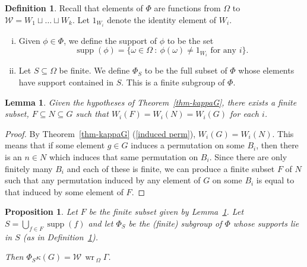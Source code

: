\documentclass[11pt,a4paper]{amsart}
\newtheorem{proposition}[theorem]{Proposition}
\newtheorem{lemma}[theorem]{Lemma}
\theoremstyle{definition}
\newtheorem{definition}[theorem]{Definition}
\theoremstyle{remark}
\newcommand{\supp}{\operatorname{supp}}
\newcommand{\base}{\Phi}
\renewcommand{\wr}{\operatorname{\,wr\,}}
\begin{document}
\begin{definition} \label{support} Recall that elements of $\base$ are functions from $\Omega$ to $\mathcal{W} = W_1 \sqcup \ldots \sqcup W_k$. Let $1_{W_i}$ denote the identity element of $W_i$. 
	\begin{enumerate}[(i)]
		\item  Given $\phi \in \Phi$, we define the support of $\phi$ to be the set $$\supp(\phi) = \{ \omega \in \Omega \ : \ \phi(\omega) \neq 1_{W_i} \text{ for any } i \}.$$
		\item  	Let $S \subseteq \Omega$ be finite. We define $\Phi_S$ to be the full subset of $\Phi$ whose elements have support contained in $S$. This is a finite subgroup of $\Phi$. 
	\end{enumerate}	
 
\end{definition}


\begin{lemma} \label{subset F}
	Given the hypotheses of Theorem~\ref{thm-kappaG}, there exists a finite subset, $F \subseteq N \subseteq G$ such that $W_i(F) = W_i(N)=W_i(G)$ for each $i$. 
\end{lemma}
\begin{proof}
	By Theorem~\ref{thm-kappaG} (\ref{induced perm}), $W_i(G) = W_i(N)$. This means that if some element $g \in G$ induces a permutation on some $B_i$, then there is an $n \in N$ which induces that same permutation on $B_i$. Since there are only finitely many $B_i$ and each of these is finite, we can produce a finite subset $F$ of $N$ such that any permutation induced by any element of $G$ on some $B_i$ is equal to that induced by some element of $F$.  
\end{proof}

\begin{proposition}
	\label{prop:coset reps}
	Let $F$ be the finite subset given by Lemma~\ref{subset F}. Let $S = \bigcup_{f \in F} \supp(f)$ and let $\Phi_S$ be the (finite) subgroup of $\Phi$ whose supports lie in $S$ (as in Definition~\ref{support}). 
	
	Then $\Phi_S \kappa(G)   = \mathcal{W}\wr_\Omega \Gamma$. 
\end{proposition}
\end{document}
